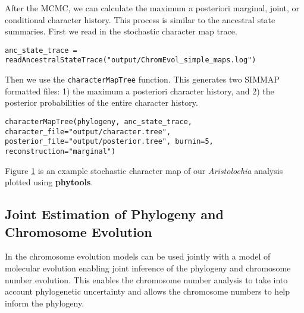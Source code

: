 After the MCMC, we can calculate the maximum a posteriori marginal, joint, or conditional
character history. This process is similar to the ancestral state summaries.
First we read in the stochastic character map trace.
{\tt \begin{snugshade*}
\begin{lstlisting}
anc_state_trace = readAncestralStateTrace("output/ChromEvol_simple_maps.log")
\end{lstlisting}
\end{snugshade*}}
Then we use the \texttt{characterMapTree} function. This generates two SIMMAP formatted files:
1) the maximum a posteriori character history, and 2) the posterior probabilities of the
entire character history.
{\tt \begin{snugshade*}
\begin{lstlisting}
characterMapTree(phylogeny, anc_state_trace, character_file="output/character.tree", posterior_file="output/posterior.tree", burnin=5, reconstruction="marginal")
\end{lstlisting}
\end{snugshade*}}
Figure \ref{fig:simmap} is an example stochastic character map of our \textit{Aristolochia} analysis plotted using \textbf{phytools}. 

\begin{figure}[h!]
\label{fig:simmap}
\end{figure}

\medskip
\subsection{Joint Estimation of Phylogeny and Chromosome Evolution}\label{subsub:joint_estimation}


In \RevBayes the chromosome evolution models can be used jointly with a model of molecular evolution 
enabling joint inference of the phylogeny and chromosome number evolution.
This enables the chromosome number analysis to take into account phylogenetic uncertainty 
and allows the chromosome numbers to help inform the phylogeny. 

